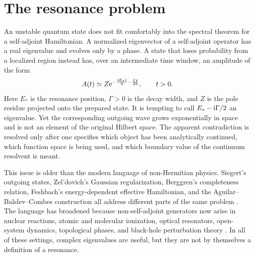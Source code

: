 \chapter{The resonance problem}
\label{sec:introduction}

An unstable quantum state does not fit comfortably into the spectral theorem
for a self-adjoint Hamiltonian.  A normalized eigenvector of a self-adjoint
operator has a real eigenvalue and evolves only by a phase.  A state that loses
probability from a localized region instead has, over an intermediate time
window, an amplitude of the form
\begin{equation}
  A(t)\simeq Z\mathrm{e}^{-\frac{\mathrm{i} E_* t}{\hbar}
  -\frac{\Gamma t}{2\hbar}},
  \qquad t>0 .
  \label{eq:intro-decay}
\end{equation}
Here $E_*$ is the resonance position, $\Gamma>0$ is the decay width, and $Z$
is the pole residue projected onto the prepared state.  It is tempting to call
$E_*-\mathrm{i}\Gamma/2$ an eigenvalue.  Yet the corresponding outgoing wave grows
exponentially in space and is not an element of the original Hilbert space.
The apparent contradiction is resolved only after one specifies which object
has been analytically continued, which function space is being used, and which
boundary value of the continuum resolvent is meant.

This issue is older than the modern language of non-Hermitian physics.
Siegert's outgoing states, Zel'dovich's Gaussian regularization, Berggren's
completeness relation, Feshbach's energy-dependent effective Hamiltonian, and
the Aguilar--Balslev--Combes construction all address different parts of the
same problem
\cite{Siegert:1939,Zel'dovich:1961,Berggren:1968zz,
Feshbach1958UnifiedI,Feshbach1962UnifiedII,Aguilar:1971ve,Balslev:1971vb}.
The language has broadened because non-self-adjoint generators now arise in
nuclear reactions, atomic and molecular ionization, optical resonators,
open-system dynamics, topological phases, and black-hole perturbation theory
\cite{Myo:2014ypa,Rotter:2007zng,Ashida2020NonHermitian,
Berti:2009kk}.  In all of these settings, complex eigenvalues are useful, but
they are not by themselves a definition of a resonance.


